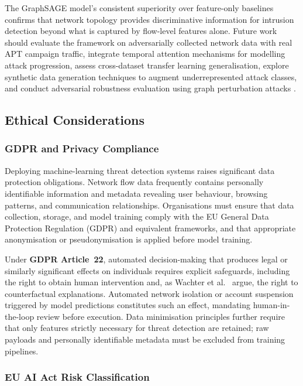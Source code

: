 \documentclass[conference]{IEEEtran}
\begin{document}
The GraphSAGE model's consistent superiority over feature-only baselines
confirms that network topology provides discriminative information for
intrusion detection beyond what is captured by flow-level features alone.
Future work should evaluate the framework on adversarially collected network
data with real APT campaign traffic, integrate temporal attention mechanisms
\cite{wang2025} for modelling attack progression, assess cross-dataset transfer
learning generalisation, explore synthetic data generation techniques
\cite{jordon2022} to augment underrepresented attack classes, and conduct
adversarial robustness evaluation using graph perturbation attacks
\cite{bilot2024}.

\subsection{Ethical Considerations}
\label{sec:ethics}

\subsubsection{GDPR and Privacy Compliance}

Deploying machine-learning threat detection systems raises significant data
protection obligations. Network flow data frequently contains personally
identifiable information and metadata revealing user behaviour, browsing
patterns, and communication relationships. Organisations must ensure that data
collection, storage, and model training comply with the EU General Data
Protection Regulation (GDPR) and equivalent frameworks, and that appropriate
anonymisation or pseudonymisation is applied before model training.

Under \textbf{GDPR Article~22}, automated decision-making that produces legal
or similarly significant effects on individuals requires explicit safeguards,
including the right to obtain human intervention and, as Wachter et al.\ \cite{wachter2017gdpr} argue, the right to counterfactual explanations. Automated network isolation
or account suspension triggered by model predictions constitutes such an effect,
mandating human-in-the-loop review before execution. Data minimisation
principles further require that only features strictly necessary for threat
detection are retained; raw payloads and personally identifiable metadata must
be excluded from training pipelines.

\subsubsection{EU AI Act Risk Classification}
\end{document}
